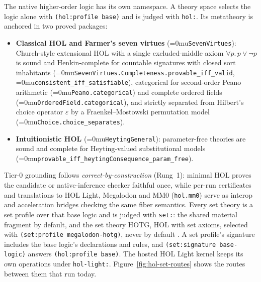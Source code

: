 \documentclass[11pt]{article}
\newcommand{\leanname}[1]{\textup{\Urlmuskip=0mu\relax\nolinkurl{#1}}}
\theoremstyle{definition}
\theoremstyle{remark}
\newcommand{\code}[1]{\texttt{#1}}
\begin{document}
The native higher-order logic has its own namespace. A theory space selects
the logic alone with \code{(hol:profile base)} and is judged with \code{hol:}.
Its metatheory is anchored in two proved packages:
\begin{itemize}[leftmargin=*]
\item \textbf{Classical HOL and Farmer's seven virtues}
  (\leanname{SevenVirtues}): Church-style extensional HOL with a single
  excluded-middle axiom $\forall p.\, p \lor \neg p$ is sound and Henkin-complete
  for countable signatures with closed sort inhabitants
  (\leanname{SevenVirtues.Completeness.provable_iff_valid},
  \leanname{consistent_iff_satisfiable}), categorical for second-order Peano
  arithmetic (\leanname{Peano.categorical}) and complete ordered fields
  (\leanname{OrderedField.categorical}), and strictly separated from Hilbert's
  choice operator $\varepsilon$ by a Fraenkel--Mostowski permutation model
  (\leanname{Choice.choice_separates}).
\item \textbf{Intuitionistic HOL} (\leanname{HeytingGeneral}): parameter-free
  theories are sound and complete for Heyting-valued substitutional models
  (\leanname{provable_iff_heytingConsequence_param_free}).
\end{itemize}
Tier-0 grounding follows \emph{correct-by-construction} (Rung~1): minimal HOL
proves the candidate or native-inference checker faithful once, while
per-run certificates and translations to HOL Light, Megalodon and MM0
(\code{hol.mm0}) serve as interop and acceleration bridges checking the same
fiber semantics.
Every set theory is a set profile over that base logic and is judged with
\code{set:}: the shared material fragment by default, and the set theory HOTG,
HOL with set axioms, selected with \code{(set:profile megalodon-hotg)}, never by
default \cite{BrownKaliszykPakHOTG}. A set profile's signature includes the
base logic's declarations and rules, and \code{(set:signature base-logic)}
answers \code{(hol:profile base)}. The hosted HOL Light kernel keeps its own
operations under \code{hol-light:}. Figure~\ref{fig:hol-set-routes} shows the
routes between them that run today.
\end{document}
